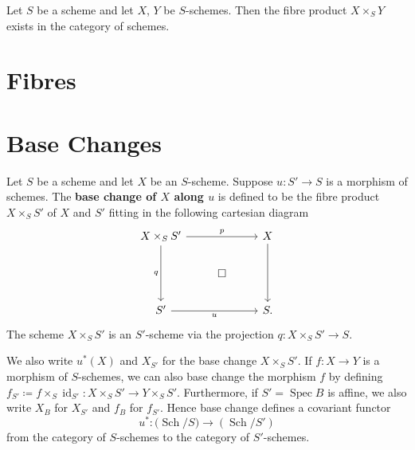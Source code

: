 \documentclass[12pt]{book}
\newcommand{\inlinedef}[1]{\textcolor{oxfordblue}{\bfseries #1}}
\theoremstyle{definition}
\newcommand{\id}{\operatorname{id}}
\DeclareMathOperator{\Spec}{Spec}
\newcommand{\Schs}{\operatorname{Sch}}
\begin{document}
	\begin{theorem}
		Let $S$ be a scheme and let $X$, $Y$ be $S$-schemes. Then the fibre product $X \times_S Y$ exists in the category of schemes.
	\end{theorem}
	
	\section{Fibres}
	
	\section{Base Changes}
	
	\begin{definition}
		Let $S$ be a scheme and let $X$ be an $S$-scheme. Suppose $u \colon S' \to S$ is a morphism of schemes. The \inlinedef{base change of $X$ along $u$} is defined to be the fibre product $X \times_S S'$ of $X$ and $S'$ fitting in the following cartesian diagram
		\[\begin{tikzcd}
			{X \times_S S'} && X \\
			& \square \\
			{S'} && {S.}
			\arrow["p", from=1-1, to=1-3]
			\arrow["q"', from=1-1, to=3-1]
			\arrow[from=1-3, to=3-3]
			\arrow["u"', from=3-1, to=3-3]
		\end{tikzcd}\]
		The scheme $X \times_S S'$ is an $S'$-scheme via the projection $q \colon X \times_S S' \to S$.
	\end{definition}
	
	We also write $u^\ast(X)$ and $X_{S'}$ for the base change $X \times_S S'$. If $f \colon X \to Y$ is a morphism of $S$-schemes, we can also base change the morphism $f$ by defining $f_{S'} \coloneqq f \times_S \id_{S'} \colon X \times_S S' \to Y \times_S S'$. Furthermore, if $S' = \Spec B$ is affine, we also write $X_B$ for $X_{S'}$ and $f_B$ for $f_{S'}$. Hence base change defines a covariant functor 
	\begin{equation*}
		u^\ast \colon \mathcal (\Schs/S) \to (\Schs/S')
	\end{equation*}
	from the category of $S$-schemes to the category of $S'$-schemes.
	
\end{document}
